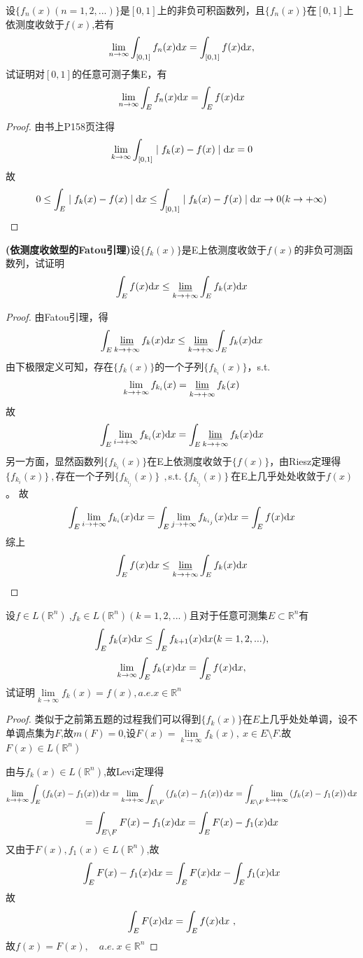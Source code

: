 设$\{f_n(x)(n=1,2,...)\}$是$[0,1]$上的非负可积函数列，且$\{f_n(x)\}$在$[0,1]$上依测度收敛于$f(x)$,若有$$\lim\limits_{n \to \infty}\int_{[0,1]} f_n(x) \mathrm{d}x=\int_{[0,1]} f(x) \mathrm{d}x,$$试证明对$[0,1]$的任意可测子集E，有$$\lim\limits_{n \to \infty}\int_{E} f_n(x) \mathrm{d}x=\int_{E} f(x) \mathrm{d}x$$
\begin{proof}
	由书上P158页注得$$\lim\limits_{k \to \infty} \int_{[0,1]} \mid f_k(x)-f(x)\mid \mathrm{d}x=0$$故$$0\leq \int_{E} \mid f_k(x)-f(x)\mid \mathrm{d}x \leq  \int_{[0,1]} \mid f_k(x)-f(x)\mid \mathrm{d}x \to 0 (k\to +\infty)$$
\end{proof}

 \textbf{(依测度收敛型的Fatou引理)}设$\{f_k(x)\}$是E上依测度收敛于$f(x)$的非负可测函数列，试证明$$\int_E f(x) \mathrm{d}x \leq \varliminf_{k \to +\infty}\int_E f_k(x) \mathrm{d}x$$
\begin{proof}
由Fatou引理，得$$\int_E \varliminf_{k \to +\infty} f_k(x) \mathrm{d}x\leq \varliminf_{k \to +\infty}\int_E f_k(x) \mathrm{d}x$$
由下极限定义可知，存在$\{f_k(x)\}$的一个子列$\{f_{k_i}(x)\}$，s.t.$$\lim\limits_{k \to +\infty} f_{k_i}(x)=\varliminf_{k \to +\infty} f_k(x)$$ 
故$$\int_E \lim\limits_{i \to +\infty} f_{k_i}(x) \mathrm{d}x = \int_E \varliminf_{k \to +\infty} f_k(x) \mathrm{d}x$$
另一方面，显然函数列$\{f_{k_i}(x)\}$在E上依测度收敛于$\{f(x)\}$，由Riesz定理得$\{f_{k_i}(x)\}\ ,$存在一个子列$\{f_{k_{i_j}}(x)\}\ \  ,$s.t.$\ \{f_{k_{i_j}}(x)\}\ $在E上几乎处处收敛于$f(x)$。
故$$\int_E \lim\limits_{i \to +\infty} f_{k_i}(x) \mathrm{d}x=\int_E \lim\limits_{j \to +\infty} f_{k_{i_j}}(x) \mathrm{d}x=\int_E f(x)\mathrm{d}x$$
综上$$\int_E f(x) \mathrm{d}x \leq \varliminf_{k \to +\infty}\int_E f_k(x) \mathrm{d}x$$
\end{proof}


设$f\in L(\mathbb{R}^n) \ $,$f_k\in L(\mathbb{R}^n)(k=1,2,...)$且对于任意可测集$E \subset \mathbb{R}^{n}$有$$\int_{E} f_k(x) \mathrm{d}x \leq \int_{E} f_{k+1}(x) \mathrm{d}x(k=1,2,...),$$
$$\lim\limits_{k \to \infty}\int_{E} f_k(x) \mathrm{d}x=\int_{E} f(x) \mathrm{d}x,$$ 试证明$\lim\limits_{k \to \infty}f_k(x)=f(x),  a.e.x \in \mathbb{R}^n$
\begin{proof}
类似于之前第五题的过程我们可以得到$\{f_k(x)\}$在$E$上几乎处处单调，设不单调点集为$F$,故$m(F)=0$,设$F(x)=\lim\limits_{k\to \infty}f_k(x),\ x\in E\setminus F$.故$F(x)\in L(\mathbb{R}^n)$\par 
由与$f_k(x)\in L(\mathbb{R}^n)$,故Levi定理得$$\lim\limits_{k\to+\infty}\int_{E}\left(f_k(x)-f_1(x)\right)\mathrm{d}x
=\lim\limits_{k\to+\infty}\int_{E\setminus F}\left(f_k(x)-f_1(x)\right)\mathrm{d}x
=\int_{E\setminus F}\lim\limits_{k\to+\infty}\left(f_k(x)-f_1(x)\right)\mathrm{d}x$$
$$=\int_{E\setminus F}F(x)-f_1(x)\mathrm{d}x=\int_{E}F(x)-f_1(x)\mathrm{d}x$$
又由于$F(x),f_1(x)\in L(\mathbb{R}^n)$,故$$\int_{E}F(x)-f_1(x)\mathrm{d}x=\int_{E}F(x)\mathrm{d}x-\int_{E}f_1(x)\mathrm{d}x$$
故$$\int_{E}F(x)\di{x}=\int_{E}f(x)\di{x}\ ,$$
故$f(x)=F(x),\quad a.e.\ x\in \mathbb{R}^n$
\end{proof}


